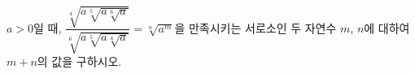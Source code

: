 $a>0$일 때, $\dfrac{\sqrt[4]{a\sqrt[5]{a\sqrt[6]{a}}}}{\sqrt[6]{a\sqrt[5]{a\sqrt[4]{a}}}}=\sqrt[n]{a^m}$을 만족시키는 서로소인 두 자연수 $m$, $n$에 대하여 $m+n$의 값을 구하시오. 
